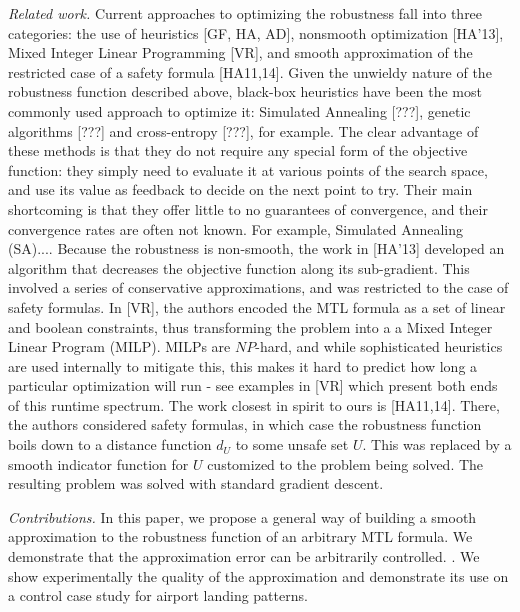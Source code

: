 \textit{Related work.}
Current approaches to optimizing the robustness fall into three categories: the use of heuristics [GF, HA, AD], nonsmooth optimization [HA'13], Mixed Integer Linear Programming [VR], and smooth approximation of the restricted case of a safety formula [HA11,14].
Given the unwieldy nature of the robustness function described above, black-box heuristics have been the most commonly used approach to optimize it: Simulated Annealing [???], genetic algorithms [???] and cross-entropy [???], for example.
The clear advantage of these methods is that they do not require any special form of the objective function: they simply need to evaluate it at various points of the search space, and use its value as feedback to decide on the next point to try.
Their main shortcoming is that they offer little to no guarantees of convergence, and their convergence rates are often not known. 
For example, Simulated Annealing (SA)....
Because the robustness is non-smooth, the work in [HA'13] developed an algorithm that decreases the objective function along its sub-gradient. This involved a series of conservative approximations, and was restricted to the case of safety formulas.
In [VR], the authors encoded the MTL formula as a set of linear and boolean constraints, thus transforming the problem into a a Mixed Integer Linear Program (MILP). 
MILPs are $NP$-hard, and while sophisticated heuristics are used internally to mitigate this, this makes it hard to predict how long a particular optimization will run - see examples in [VR] which present both ends of this runtime spectrum.
The work closest in spirit to ours is [HA11,14]. 
There, the authors considered safety formulas, in which case the robustness function boils down to a distance function $d_U$ to some unsafe set $U$. 
This was replaced by a smooth indicator function for $U$ customized to the problem being solved.
The resulting problem was solved with standard gradient descent.

\textit{Contributions.}
In this paper, we propose a general way of building a smooth approximation to the robustness function of an arbitrary MTL formula.
We demonstrate that the approximation error can be arbitrarily controlled.
.
We show experimentally the quality of the approximation and demonstrate its use on a control case study for airport landing patterns.
